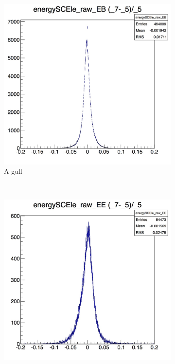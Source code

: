 \documentclass[10pt]{article}
\begin{document}
\begin{figure}[h!]
        \centering
        \begin{subfigure}[b]{0.4\textwidth}
                \includegraphics[width=\textwidth]{Plots/rawEnergySC_EB}
                \caption{A gull}
                \label{fig:gull}
        \end{subfigure}%
        ~ %
        \begin{subfigure}[b]{0.4\textwidth}
                \includegraphics[width=\textwidth]{Plots/rawEnergySC_EE}

\end{subfigure}
\end{figure}
\end{document}
